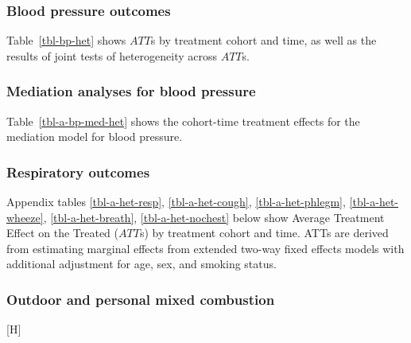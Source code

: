 \documentclass[
  letterpaper,
  DIV=11,
  numbers=noendperiod]{scrartcl}
\makeatletter
\renewenvironment{figure}%
   {\renewcommand\familydefault\sfdefault
    \@float{figure}}
   {\end@float}
\makeatother
\begin{document}
\newpage

\subsubsection{Blood pressure outcomes}\label{blood-pressure-outcomes}

Table~\ref{tbl-bp-het} shows \(ATT\)s by treatment cohort and time, as
well as the results of joint tests of heterogeneity across \(ATT\)s.

\newpage

\subsubsection{Mediation analyses for blood
pressure}\label{mediation-analyses-for-blood-pressure}

Table~\ref{tbl-a-bp-med-het} shows the cohort-time treatment effects for
the mediation model for blood pressure.

\newpage

\subsubsection{Respiratory outcomes}\label{respiratory-outcomes}

Appendix tables \ref{tbl-a-het-resp}, \ref{tbl-a-het-cough},
\ref{tbl-a-het-phlegm}, \ref{tbl-a-het-wheeze}, \ref{tbl-a-het-breath},
\ref{tbl-a-het-nochest} below show Average Treatment Effect on the
Treated (\(ATT\)s) by treatment cohort and time. ATTs are derived from
estimating marginal effects from extended two-way fixed effects models
with additional adjustment for age, sex, and smoking status.

\newpage

\subsubsection{Outdoor and personal mixed
combustion}\label{outdoor-and-personal-mixed-combustion}

\begin{figure}[H]


\caption{\label{fig-afig-mixed-ct}Adjusted and unadjusted treatment
effect for outdoor and personal exposure (µg/m\textsuperscript{3}) to
the mixed combustion source by treatment year.}

\end{figure}%
\end{document}
